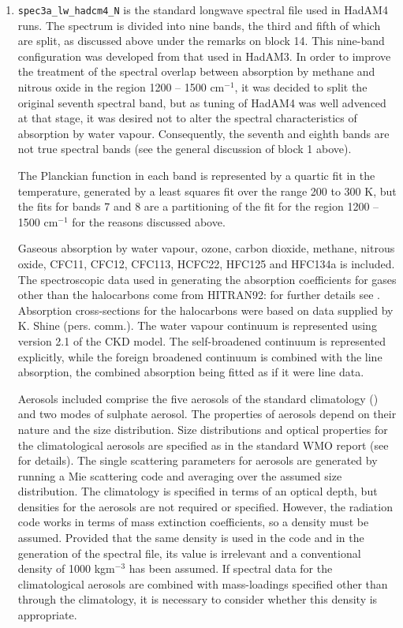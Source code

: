 \begin{enumerate}
\item
{\large \tt spec3a\_lw\_hadcm4\_N} is the standard longwave spectral 
file used in HadAM4 runs. The spectrum is divided into nine bands, the
third and fifth of which are split, as discussed above
under the remarks on block 14. This nine-band configuration was
developed from that used in HadAM3. In order to improve the treatment
of the spectral overlap between absorption by methane and nitrous
oxide in the region 1200 -- 1500 cm${}^{-1}$, it was decided to split
the original seventh spectral band, but as tuning of HadAM4 was well
advenced at that stage, it was desired not to alter the spectral 
characteristics of absorption by water vapour. Consequently, the
seventh and eighth bands are not true spectral bands (see the general
discussion of block 1 above).

The Planckian function in each band is represented by a quartic fit
in the temperature, generated by a least squares fit over the range
200 to 300 K, but the fits for bands 7 and 8 are a partitioning of
the fit for the region 1200 -- 1500 cm${}^{-1}$ for the reasons discussed
above.

Gaseous absorption by water vapour, ozone, carbon dioxide, methane, 
nitrous oxide, CFC11, CFC12, CFC113, HCFC22, HFC125 and HFC134a is 
included. The spectroscopic data used in generating the absorption 
coefficients for gases other than the halocarbons come from HITRAN92: 
for further details see \citet{Cusack99ck}. Absorption
cross-sections for the halocarbons were based on data supplied by
K. Shine (pers. comm.).
The water vapour continuum is represented 
using version 2.1 of the CKD model. The self-broadened continuum is
represented explicitly, while the foreign broadened continuum is
combined with the line absorption, the combined absorption being
fitted as if it were line data.

Aerosols included comprise the five aerosols of the standard climatology
(\citet{Cusack98a}) and two modes of sulphate aerosol.
The properties of aerosols depend on their nature and the size distribution.
Size distributions and optical properties for the climatological aerosols
are specified as in the standard WMO report (see \citet{Cusack98a} for
details). 
The single scattering parameters for aerosols are generated by running a 
Mie scattering code and averaging over the assumed size distribution.
The climatology is specified in terms of an optical depth, but densities
for the aerosols are not required or specified. However, the radiation
code works in terms of mass extinction coefficients, so a density must
be assumed. Provided that the same density is used in the code and in
the generation of the spectral file, its value is irrelevant and a 
conventional density of 1000 kgm${}^{-3}$ has been assumed. If spectral
data for the climatological aerosols are combined with mass-loadings
specified other than through the climatology, it is necessary to
consider whether this density is appropriate.


\end{enumerate}
